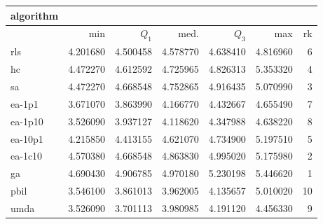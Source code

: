 \begin{tabular}{@{}l*{5}{>{{}}N{1}{2}}>{{}}N{2}{0}@{}}
\toprule
{algorithm} &  \\
\midrule
& {min} & {$Q_1$} & {med.} & {$Q_3$} & {max} & {rk}\\
\midrule
rls & 4.201680 & 4.500458 & 4.578770 & 4.638410 & 4.816960 & 6\\
hc & 4.472270 & 4.612592 & 4.725965 & 4.826313 & 5.353320 & 4\\
sa & 4.472270 & 4.668548 & 4.752865 & 4.916435 & 5.070990 & 3\\
ea-1p1 & 3.671070 & 3.863990 & 4.166770 & 4.432667 & 4.655490 & 7\\
ea-1p10 & 3.526090 & 3.937127 & 4.118620 & 4.347988 & 4.638220 & 8\\
ea-10p1 & 4.215850 & 4.413155 & 4.621070 & 4.734900 & 5.197510 & 5\\
ea-1c10 & 4.570380 & 4.668548 & 4.863830 & 4.995020 & 5.175980 & 2\\
ga & {\color{blue}} 4.690430 & {\color{blue}} 4.906785 & {\color{blue}} 4.970180 & {\color{blue}} 5.230198 & {\color{blue}} 5.446620 & 1\\
pbil & 3.546100 & 3.861013 & 3.962005 & 4.135657 & 5.010020 & 10\\
umda & 3.526090 & 3.701113 & 3.980985 & 4.191120 & 4.456330 & 9\\
\bottomrule
\end{tabular}
